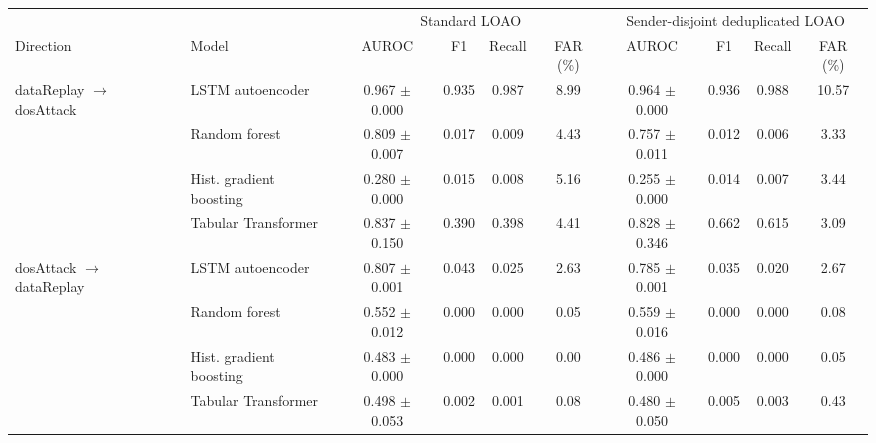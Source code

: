 \begin{tabular}{llcccccccc}
\toprule
& & \multicolumn{4}{c}{Standard LOAO} & \multicolumn{4}{c}{Sender-disjoint deduplicated LOAO} \\
\cmidrule(lr){3-6}\cmidrule(lr){7-10}
Direction & Model & AUROC & F1 & Recall & FAR (\%) & AUROC & F1 & Recall & FAR (\%) \\
\midrule
dataReplay $\rightarrow$ dosAttack & LSTM autoencoder & 0.967 $\pm$ 0.000 & 0.935 & 0.987 & 8.99 & 0.964 $\pm$ 0.000 & 0.936 & 0.988 & 10.57 \\
 & Random forest & 0.809 $\pm$ 0.007 & 0.017 & 0.009 & 4.43 & 0.757 $\pm$ 0.011 & 0.012 & 0.006 & 3.33 \\
 & Hist. gradient boosting & 0.280 $\pm$ 0.000 & 0.015 & 0.008 & 5.16 & 0.255 $\pm$ 0.000 & 0.014 & 0.007 & 3.44 \\
 & Tabular Transformer & 0.837 $\pm$ 0.150 & 0.390 & 0.398 & 4.41 & 0.828 $\pm$ 0.346 & 0.662 & 0.615 & 3.09 \\
\midrule
dosAttack $\rightarrow$ dataReplay & LSTM autoencoder & 0.807 $\pm$ 0.001 & 0.043 & 0.025 & 2.63 & 0.785 $\pm$ 0.001 & 0.035 & 0.020 & 2.67 \\
 & Random forest & 0.552 $\pm$ 0.012 & 0.000 & 0.000 & 0.05 & 0.559 $\pm$ 0.016 & 0.000 & 0.000 & 0.08 \\
 & Hist. gradient boosting & 0.483 $\pm$ 0.000 & 0.000 & 0.000 & 0.00 & 0.486 $\pm$ 0.000 & 0.000 & 0.000 & 0.05 \\
 & Tabular Transformer & 0.498 $\pm$ 0.053 & 0.002 & 0.001 & 0.08 & 0.480 $\pm$ 0.050 & 0.005 & 0.003 & 0.43 \\
\bottomrule
\end{tabular}

